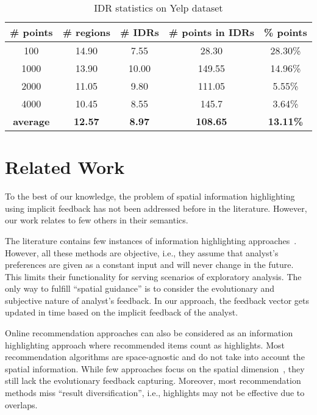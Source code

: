 \documentclass[sigconf,edbt]{acmart-edbt2019}
\begin{document}
\begin{table}[t]
\centering
\caption{IDR statistics on \textsf{Yelp} dataset}
\label{tbl:yelp}
\begin{tabular}{|c|c|c|c|c|}
\cline{1-5}
\textbf{\# points}  & \textbf{\# regions} 	& \textbf{\# IDRs} 	& \textbf{\# points in IDRs}	& \textbf{\%  points}	\\ \hline
\multicolumn{1}{|c|}{100} 				& 14.90            	& 7.55	          	& 28.30             & 28.30\%            
 \\ \hline
\multicolumn{1}{|c|}{1000} 				& 13.90         	& 10.00	          	& 149.55             & 14.96\%              \\ \hline
\multicolumn{1}{|c|}{2000} 				& 11.05         	& 9.80         	& 111.05             & 5.55\%              \\ \hline
\multicolumn{1}{|c|}{4000} 				& 10.45          	& 8.55	          	& 145.7              & 3.64\%              \\ \hline
\multicolumn{1}{|c|}{\textbf{average}} 				& \textbf{12.57}           	& \textbf{8.97}	          	& \textbf{108.65}              & \textbf{13.11\%}              \\ \hline
\end{tabular}
\end{table}

\section{Related Work}
\label{sec:rel}
To the best of our knowledge, the problem of spatial information highlighting using implicit feedback has not been addressed before in the literature. However, our work relates to few others in their semantics.

\vspace{3pt}
 The literature contains few instances of information highlighting approaches~\cite{Liang2010,Robinson2011,wongsuphasawat2016voyager,willett2007scented}. However, all these methods are objective, i.e., they 	assume that analyst's preferences are given as a constant input and will never change in the future. This limits their functionality for serving scenarios of exploratory analysis. The only way to fulfill ``spatial guidance'' is to consider the evolutionary and subjective nature of analyst's feedback. In our approach, the feedback vector gets updated in time based on the implicit feedback of the analyst.

\vspace{2pt}
Online recommendation approaches can also be considered as an information highlighting approach where recommended items count as highlights. Most recommendation algorithms are space-agnostic and do not take into account the spatial information. While few approaches focus on the spatial dimension~\cite{Bao2015,Levandoski:2012,DrosouP12}, they still lack the evolutionary feedback capturing. Moreover, most recommendation methods miss ``result diversification'', i.e., highlights may not be effective due to overlaps.
\end{document}
